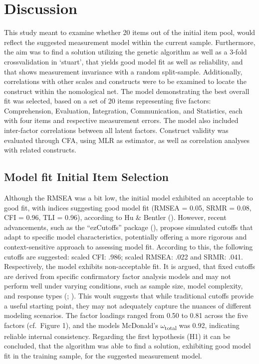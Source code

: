 \documentclass[
  12pt,
  a4paper,
  twoside]{article}
\begin{document}
\section{Discussion}\label{discussion}

This study meant to examine whether 20 items out of the initial item pool, would reflect the suggested measurement model within the current sample. Furthermore, the aim was to find a solution utilizing the genetic algorithm as well as a 3-fold crossvalidation in `stuart', that yields good model fit as well as reliability, and that shows measurement invariance with a random split-sample. Additionally, correlations with other scales and constructs were to be examined to locate the construct within the nomological net.
The model demonstrating the best overall fit was selected, based on a set of 20 items representing five factors: Comprehension, Evaluation, Integration, Communication, and Statistics, each with four items and respective measurement errors. The model also included inter-factor correlations between all latent factors.
Construct validity was evaluated through CFA, using MLR as estimator, as well as correlation analyses with related constructs.

\subsection{Model fit Initial Item Selection}\label{model-fit-initial-item-selection}

Although the RMSEA was a bit low, the initial model exhibited an acceptable to good fit, with indices suggesting good model fit (RMSEA = 0.05, SRMR = 0.08, CFI = 0.96, TLI = 0.96), according to Hu \& Bentler ().
However, recent advancements, such as the ``ezCutoffs'' package (), propose simulated cutoffs that adapt to specific model characteristics, potentially offering a more rigorous and context-sensitive approach to assessing model fit.
According to this, the following cutoffs are suggested: scaled CFI: .986; scaled RMSEA: .022 and SRMR: .041.
Respectively, the model exhibits non-acceptable fit.
It is argued, that fixed cutoffs are derived from specific confirmatory factor analysis models and may not perform well under varying conditions, such as sample size, model complexity, and response types (; ).
This woult suggests that while traditional cutoffs provide a useful starting point, they may not adequately capture the nuances of different modeling scenarios.
The factor loadings ranged from 0.50 to 0.81 across the five factors (cf.~Figure 1), and the models McDonald's \(\omega\)\textsubscript{total} was 0.92, indicating reliable internal consistency.
Regarding the first hypothesis (H1) it can be concluded, that the algorithm was able to find a solution, exhibiting good model fit in the training sample, for the suggested measurement model.
\end{document}
